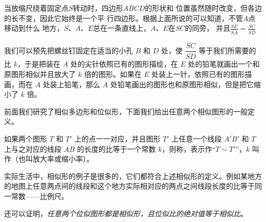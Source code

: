 当放缩尺绕着固定点$S$转动时，四边形$ABCD$的形状和
位置虽然随时改变，但各边的长不变，因此它始终是一个平
行四边形。根据上面所说的可以知道，不管$A$点移动到什么
地方，$S$、$A$、$E$总在一条直线上，$A$、$E$在$SC$的同旁，
并且$\frac{\overline{SE}}{\overline{SA}}=\frac{\overline{SC}}{\overline{SD}}$

我们可以预先把螺丝钉固定在适当的小孔 $B$ 和 $D$ 处，使 $\dfrac{\overline{SC}}{\overline{SD}}$ 等于我们所需要的比 $k$，于是把装在 $A$ 处的尖针依照已有的图形描绘，在 $E$ 处的铅笔就画出一个和原图形相似并且放大了 $k$ 倍的图形。如果在 $E$ 处装上一针，依照已有的图形描画，而在 $A$ 处装上铅笔，那么 $A$ 处铅笔画出的图形也和原图形相似，但是把它缩小了 $k$ 倍。

前面我们研究了相似多边形和位似形，下面我们给出任意两个相似图形的一般定义。

\begin{Definition}
如果两个图形 $T$ 和 $T'$ 上的点一一对应，并且图形
$T'$ 上任意一个线段 $\overline{A'B'}$ 和 $T$ 上与之对应的线段 $\overline{AB}$ 的长度的比等于一个常数 $k$，则称，表示作“$T\sim T'$”，$k$ 叫作（也叫放大率或缩小率）。
\end{Definition}

实际生活中，相似形的例子是很多的，它们都符合上述相似形的定义。例如某地方的地图上任意两点间的线段和这个地方实际相对应的两点之间线段长度的比等于同一常数——比例尺。

还可以证明，\emph{任意两个位似图形都是相似形，且位似比的绝对值等于相似比}。


